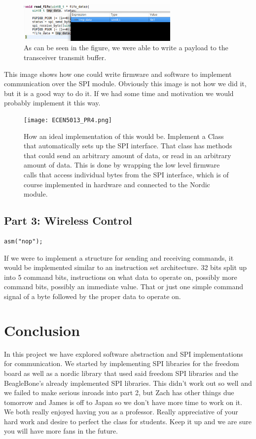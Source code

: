 \documentclass{article}
\begin{document}
\begin{figure}[H]
    \centering
    \includegraphics[width=0.7\textwidth]{tx_payload_add.png}
    \caption{As can be seen in the figure, we were able to write a payload to the transceiver transmit buffer.}
\end{figure}

This image shows how one could write firmware and software to implement communication over the SPI module. Obviously this image is not how we did it, but it is a good way to do it. If we had some time and motivation we would probably implement it this way.
\begin{figure}[H]
    \centering
    \texttt{[image: ECEN5013\_PR4.png]}
    \caption{How an ideal implementation of this would be. Implement a Class that automatically sets up the SPI interface. That class has methods that could send an arbitrary amount of data, or read in an arbitrary amount of data. This is done by wrapping the low level firmware calls that access individual bytes from the SPI interface, which is of course implemented in hardware and connected to the Nordic module.}
\end{figure}

\subsection*{Part 3: Wireless Control}
\begin{lstlisting}
asm("nop");
\end{lstlisting}

If we were to implement a structure for sending and receiving commands, it would be implemented similar to an instruction set architecture. 32 bits split up into 5 command bits, instructions on what data to operate on, possibly more command bits, possibly an immediate value. That or just one simple command signal of a byte followed by the proper data to operate on.

\section*{Conclusion}
In this project we have explored software abstraction and SPI implementations for communication. We started by implementing SPI libraries for the freedom board as well as a nordic library that used said freedom SPI libraries and the BeagleBone's already implemented SPI libraries. This didn't work out so well and we failed to make serious inroads into part 2, but Zach has other things due tomorrow and James is off to Japan so we don't have more time to work on it. We both really enjoyed having you as a professor. Really appreciative of your hard work and desire to perfect the class for students. Keep it up and we are sure you will have more fans in the future.
\end{document}
